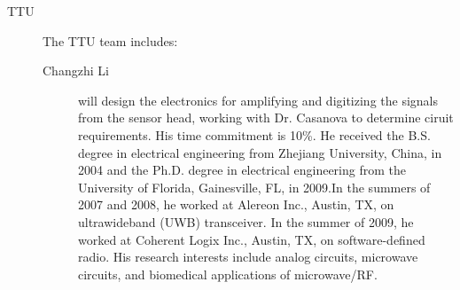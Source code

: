 \begin{description}
\begin{description}
  \end{description} 
\item[TTU] The TTU team includes:
  \begin{description}
  \item[Changzhi Li] will design the electronics for amplifying and digitizing the signals from the sensor head, working with Dr. Casanova to determine ciruit requirements. His time commitment is 10\%. He received the B.S. degree in electrical engineering from Zhejiang University, China, in 2004 and the Ph.D. degree in electrical engineering from the University of Florida, Gainesville, FL, in 2009.In the summers of 2007 and 2008, he worked at Alereon Inc., Austin, TX, on ultrawideband (UWB) transceiver. In the summer of 2009, he worked at Coherent Logix Inc., Austin, TX, on software-defined radio. His research interests include analog circuits, microwave circuits, and biomedical applications of microwave/RF.
  \end{description}
\end{description}
